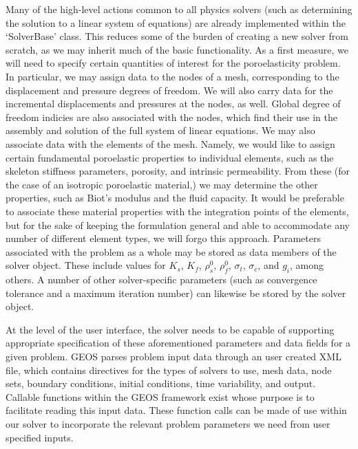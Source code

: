 \documentclass[11pt]{article} %
\begin{document}
Many of the high-level actions common to all physics solvers (such as determining the solution to a linear system of equations) are already implemented within the `SolverBase' class. This reduces some of the burden of creating a new solver from scratch, as we may inherit much of the basic functionality. As a first measure, we will need to specify certain quantities of interest for the poroelasticity problem. In particular, we may assign data to the nodes of a mesh, corresponding to the displacement and pressure degrees of freedom. We will also carry data for the incremental displacements and pressures at the nodes, as well. Global degree of freedom indicies are also associated with the nodes, which find their use in the assembly and solution of the full system of linear equations. We may also associate data with the elements of the mesh. Namely, we would like to assign certain fundamental poroelastic properties to individual elements, such as the skeleton stiffness parameters, porosity, and intrinsic permeability. From these (for the case of an isotropic poroelastic material,) we may determine the other properties, such as Biot's modulus and the fluid capacity. It would be preferable to associate these material properties with the integration points of the elements, but for the sake of keeping the formulation general and able to accommodate any number of different element types, we will forgo this approach. Parameters associated with the problem as a whole may be stored as data members of the solver object. These include values for $K_s$, $K_f$, $\rho_s^0$, $\rho_f^0$, $\sigma_t$, $\sigma_c$, and $g_i$, among others. A number of other solver-specific parameters (such as convergence tolerance and a maximum iteration number) can likewise be stored by the solver object.

At the level of the user interface, the solver needs to be capable of supporting appropriate specification of these aforementioned parameters and data fields for a given problem. GEOS parses problem input data through an user created XML file, which contains directives for the types of solvers to use, mesh data, node sets, boundary conditions, initial conditions, time variability, and output. Callable functions within the GEOS framework exist whose purpose is to facilitate reading this input data. These function calls can be made of use within our solver to incorporate the relevant problem parameters we need from user specified inputs.
\end{document}
